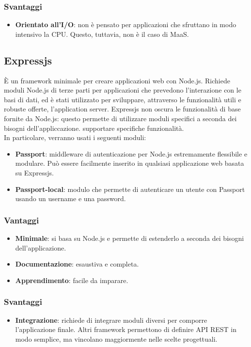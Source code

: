 \subsubsection{Svantaggi}
\begin{itemize}
\item \textbf{Orientato all'I/O}: non \`e pensato per applicazioni che sfruttano in modo intensivo la CPU. Questo, tuttavia, non \`e il caso di MaaS.
\end{itemize}
\subsection{Expressjs}
È un framework minimale per creare applicazioni web con Node.js. Richiede moduli Node.js di terze parti per applicazioni che prevedono l’interazione con le basi di dati, ed è stati utilizzato per sviluppare, attraverso le funzionalità utili e robuste offerte, l’application server. Expressjs non oscura le funzionalità di base fornite da Node.js: questo permette di utilizzare moduli specifici a seconda dei bisogni dell'appliccazione.
supportare specifiche funzionalità. \\
In particolare, verranno usati i seguenti moduli:
\begin{itemize}
\item \textbf{Passport}: middleware di autenticazione per Node.js estremamente flessibile e modulare. Può essere facilmente inserito in qualsiasi applicazione web basata su
Expressjs.
\item \textbf{Passport-local}: modulo che permette di autenticare un utente con Passport usando un username e una password.
\end{itemize}
\subsubsection{Vantaggi}
\begin{itemize}
\item \textbf{Minimale}: si basa su Node.js e permette di estenderlo a seconda dei bisogni dell'applicazione.
\item \textbf{Documentazione}: esaustiva e completa.
\item \textbf{Apprendimento}: facile da imparare.
\end{itemize}
\subsubsection{Svantaggi}
\begin{itemize}
\item \textbf{Integrazione}: richiede di integrare moduli diversi per comporre l'applicazione finale. Altri framework permettono di definire API REST in modo semplice, ma vincolano maggiormente nelle scelte progettuali.
\end{itemize}
